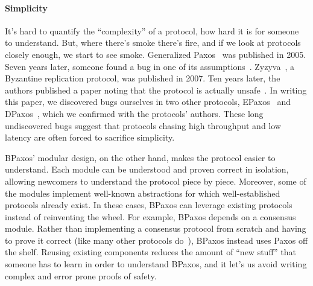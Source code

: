 \paragraph{Simplicity}
It's hard to quantify the ``complexity'' of a protocol, how hard it is for
someone to understand. But, where there's smoke there's fire, and if we look at
protocols closely enough, we start to see smoke. Generalized
Paxos~\cite{lamport2005generalized} was published in 2005. Seven years later,
someone found a bug in one of its assumptions~\cite{sutra2011fast}.
Zyzyva~\cite{kotla2007zyzzyva}, a Byzantine replication protocol, was published
in 2007. Ten years later, the authors published a paper noting that the
protocol is actually unsafe~\cite{abraham2017revisiting}. In writing this
paper, we discovered bugs ourselves in two other protocols,
EPaxos~\cite{moraru2013there} and DPaxos~\cite{nawab2018dpaxos}, which we
confirmed with the protocols' authors. These long undiscovered bugs suggest
that protocols chasing high throughput and low latency are often forced to
sacrifice simplicity.

BPaxos' modular design, on the other hand, makes the protocol easier to
understand. Each module can be understood and proven correct in isolation,
allowing newcomers to understand the protocol piece by piece. Moreover, some of
the modules implement well-known abstractions for which well-established
protocols already exist. In these cases, BPaxos can leverage existing protocols
instead of reinventing the wheel. For example, BPaxos depends on a consensus
module. Rather than implementing a consensus protocol from scratch and having
to prove it correct (like many other protocols do~\cite{moraru2013there,
arun2017speeding, nawab2018dpaxos}), BPaxos instead uses Paxos off the shelf.
Reusing existing components reduces the amount of ``new stuff'' that someone
has to learn in order to understand BPaxos, and it let's us avoid writing
complex and error prone proofs of safety.

